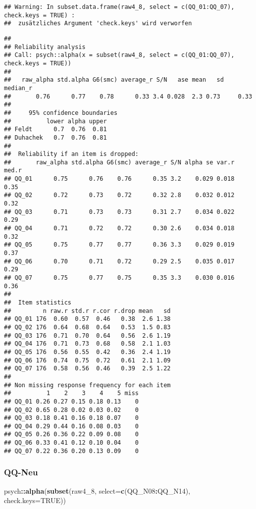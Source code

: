 \documentclass[
]{article}
\newenvironment{Shaded}{\begin{snugshade}}{\end{snugshade}}
\newcommand{\AttributeTok}[1]{\textcolor[rgb]{0.13,0.29,0.53}{#1}}
\newcommand{\ConstantTok}[1]{\textcolor[rgb]{0.56,0.35,0.01}{#1}}
\newcommand{\FunctionTok}[1]{\textcolor[rgb]{0.13,0.29,0.53}{\textbf{#1}}}
\newcommand{\NormalTok}[1]{#1}
\newcommand{\SpecialCharTok}[1]{\textcolor[rgb]{0.81,0.36,0.00}{\textbf{#1}}}
\begin{document}
\begin{verbatim}
## Warning: In subset.data.frame(raw4_8, select = c(QQ_01:QQ_07), check.keys = TRUE) :
##  zusätzliches Argument 'check.keys' wird verworfen
\end{verbatim}

\begin{verbatim}
## 
## Reliability analysis   
## Call: psych::alpha(x = subset(raw4_8, select = c(QQ_01:QQ_07), check.keys = TRUE))
## 
##   raw_alpha std.alpha G6(smc) average_r S/N   ase mean   sd median_r
##       0.76      0.77    0.78      0.33 3.4 0.028  2.3 0.73     0.33
## 
##     95% confidence boundaries 
##          lower alpha upper
## Feldt      0.7  0.76  0.81
## Duhachek   0.7  0.76  0.81
## 
##  Reliability if an item is dropped:
##       raw_alpha std.alpha G6(smc) average_r S/N alpha se var.r med.r
## QQ_01      0.75      0.76    0.76      0.35 3.2    0.029 0.018  0.35
## QQ_02      0.72      0.73    0.72      0.32 2.8    0.032 0.012  0.32
## QQ_03      0.71      0.73    0.73      0.31 2.7    0.034 0.022  0.29
## QQ_04      0.71      0.72    0.72      0.30 2.6    0.034 0.018  0.32
## QQ_05      0.75      0.77    0.77      0.36 3.3    0.029 0.019  0.37
## QQ_06      0.70      0.71    0.72      0.29 2.5    0.035 0.017  0.29
## QQ_07      0.75      0.77    0.75      0.35 3.3    0.030 0.016  0.36
## 
##  Item statistics 
##         n raw.r std.r r.cor r.drop mean   sd
## QQ_01 176  0.60  0.57  0.46   0.38  2.6 1.38
## QQ_02 176  0.64  0.68  0.64   0.53  1.5 0.83
## QQ_03 176  0.71  0.70  0.64   0.56  2.6 1.19
## QQ_04 176  0.71  0.73  0.68   0.58  2.1 1.03
## QQ_05 176  0.56  0.55  0.42   0.36  2.4 1.19
## QQ_06 176  0.74  0.75  0.72   0.61  2.1 1.09
## QQ_07 176  0.58  0.56  0.46   0.39  2.5 1.22
## 
## Non missing response frequency for each item
##          1    2    3    4    5 miss
## QQ_01 0.26 0.27 0.15 0.18 0.13    0
## QQ_02 0.65 0.28 0.02 0.03 0.02    0
## QQ_03 0.18 0.41 0.16 0.18 0.07    0
## QQ_04 0.29 0.44 0.16 0.08 0.03    0
## QQ_05 0.26 0.36 0.22 0.09 0.08    0
## QQ_06 0.33 0.41 0.12 0.10 0.04    0
## QQ_07 0.22 0.36 0.20 0.13 0.09    0
\end{verbatim}

\subsubsection{QQ-Neu}\label{qq-neu}

\begin{Shaded}
\begin{Highlighting}[]
\NormalTok{psych}\SpecialCharTok{::}\FunctionTok{alpha}\NormalTok{(}\FunctionTok{subset}\NormalTok{(raw4\_8, }\AttributeTok{select=}\FunctionTok{c}\NormalTok{(QQ\_N08}\SpecialCharTok{:}\NormalTok{QQ\_N14), }\AttributeTok{check.keys=}\ConstantTok{TRUE}\NormalTok{))}
\end{Highlighting}
\end{Shaded}
\end{document}
